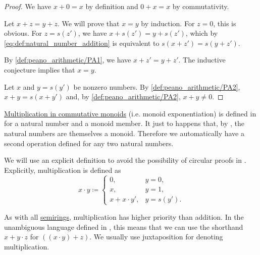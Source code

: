 \begin{proof}
   We have \( x + 0 = x \) by definition and \( 0 + x = x \) by commutativity.

   Let \( x + z = y + z \). We will prove that \( x = y \) by induction\IND. For \( z = 0 \), this is obvious. For \( z = s(z') \), we have \( x + s(z') = y + s(z') \), which by \eqref{eq:def:natural_number_addition} is equivalent to \( s(x + z') = s(y + z') \).

  By \ref{def:peano_arithmetic/PA1}, we have \( x + z' = y + z' \). The inductive conjecture implies that \( x = y \).

   Let \( x \) and \( y = s(y') \) be nonzero numbers. By \ref{def:peano_arithmetic/PA2}, \( x + y = s(x + y') \) and, by \ref{def:peano_arithmetic/PA2}, \( x + y \neq 0 \).
\end{proof}

\begin{definition}\label{def:natural_number_multiplication}
  \hyperref[rem:additive_magma/multiplication]{Multiplication in commutative monoids} (i.e. monoid exponentiation) is defined in  for a natural number and a monoid member. It just to happens that, by , the natural numbers are themselves a monoid. Therefore we automatically have a second  operation defined for any two natural numbers.

  We will use an explicit definition to avoid the possibility of circular proofs in . Explicitly, multiplication is defined as
  \begin{equation}\label{eq:def:natural_number_multiplication}
    x \cdot y \coloneqq \begin{cases}
      0,              &y = 0,     \\
      x,              &y = 1,     \\
      x + x \cdot y', &y = s(y').
    \end{cases}
  \end{equation}

  As with all \hyperref[def:semiring]{semirings}, multiplication has higher priority than addition. In the unambiguous language defined in , this means that we can use the shorthand \( x + y \cdot z \) for \( ((x \cdot y) + z) \). We usually use juxtaposition for denoting multiplication.
\end{definition}

